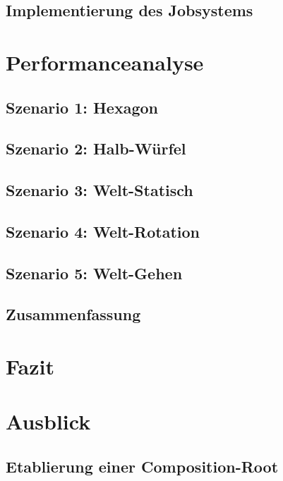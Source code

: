 \documentclass[12pt,a4paper,listof=toc,parskip=half,numbers=noenddot,abstract=true]{scrartcl}
\begin{document}
\subsection{Implementierung des Jobsystems}


\clearpage
\section{Performanceanalyse}\label{kap:performance}

\subsection{Szenario 1: Hexagon}

\subsection{Szenario 2: Halb-Würfel}

\subsection{Szenario 3: Welt-Statisch}

\subsection{Szenario 4: Welt-Rotation}

\subsection{Szenario 5: Welt-Gehen}

\subsection{Zusammenfassung}


\clearpage
\section{Fazit}\label{kap:Fazit}

\clearpage
\section{Ausblick}\label{kap:ausblick}

\subsection{Etablierung einer Composition-Root}\label{sec:EtablierungEinerKompositionroot}

\end{document}
